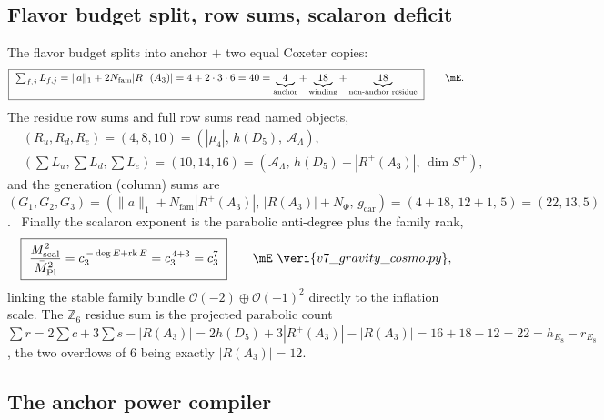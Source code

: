 \documentclass[11pt,a4paper]{article}
\newcommand{\Mbar}{\bar M_{\mathrm{Pl}}}
\newcommand{\gcar}{g_{\mathrm{car}}}
\newcommand{\Nfam}{N_{\mathrm{fam}}}
\newcommand{\cthree}{c_3}
\newcommand{\AL}{\mathcal A_\Lambda}
\theoremstyle{definition}
\begin{document}
\subsection{Flavor budget split, row sums, scalaron deficit}
The flavor budget splits into anchor $+$ two equal Coxeter copies:
\begin{equation}
  \boxed{\ \textstyle\sum_{f,j}L_{f,j}=\|a\|_1+2\Nfam|R^+(A_3)|=4+2\cdot3\cdot6=40=\underbrace{4}_{\text{anchor}}+\underbrace{18}_{\text{winding}}+\underbrace{18}_{\text{non-anchor residue}}\ }\qquad\mE .
\end{equation}
The residue row sums and full row sums read named objects,
\begin{equation}
\begin{aligned}
  &(R_u,R_d,R_e)=(4,8,10)=(|\mu_4|,\,h(D_5),\,\AL),\\
  &(\textstyle\sum L_u,\sum L_d,\sum L_e)=(10,14,16)=(\AL,\,h(D_5)+|R^+(A_3)|,\,\dim S^+),
\end{aligned}
\end{equation}
and the generation (column) sums are
$(G_1,G_2,G_3)=(\|a\|_1+\Nfam|R^+(A_3)|,\,|R(A_3)|+N_\Phi,\,\gcar)=(4{+}18,\,12{+}1,\,5)=(22,13,5)$. \mE\
Finally the scalaron exponent is the parabolic anti-degree plus the family rank,
\begin{equation}
  \boxed{\ \frac{M_{\mathrm{scal}}^2}{\Mbar^2}=\cthree^{\,-\deg E+\operatorname{rk}E}=\cthree^{\,4+3}=\cthree^7\ }\qquad\mE\ \veri{v7\_gravity\_cosmo.py} ,
\end{equation}
linking the stable family bundle $\mathcal O(-2)\oplus\mathcal O(-1)^2$ directly to the inflation scale.
The $\mathbb Z_6$ residue sum is the projected parabolic count
$\sum r=2\sum c+3\sum s-|R(A_3)|=2h(D_5)+3|R^+(A_3)|-|R(A_3)|=16+18-12=22=h_{E_8}-r_{E_8}$,
the two overflows of $6$ being exactly $|R(A_3)|=12$. \mE

\subsection{The anchor power compiler}
\end{document}

